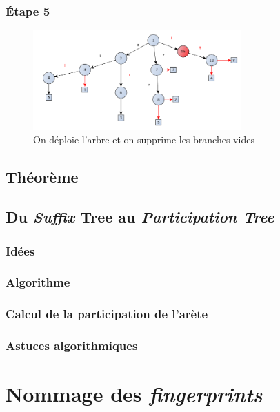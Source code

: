 \documentclass[a4paper]{article}
\begin{document}
\subsubsection{Étape 5}

\begin{figure}[H]
\centering
\includegraphics[width=80mm]{./slides/img/construction-45.png}
\caption{On déploie l'arbre et on supprime les branches vides}
\label{overflow}
\end{figure}

\subsection{Théorème}

\subsection{Du \emph{Suffix} Tree au \emph{Participation Tree}}

\subsubsection{Idées}

\subsubsection{Algorithme}

\subsubsection{Calcul de la participation de l'arète}

\subsubsection{Astuces algorithmiques}

\section{Nommage des \emph{fingerprints}}
\end{document}

